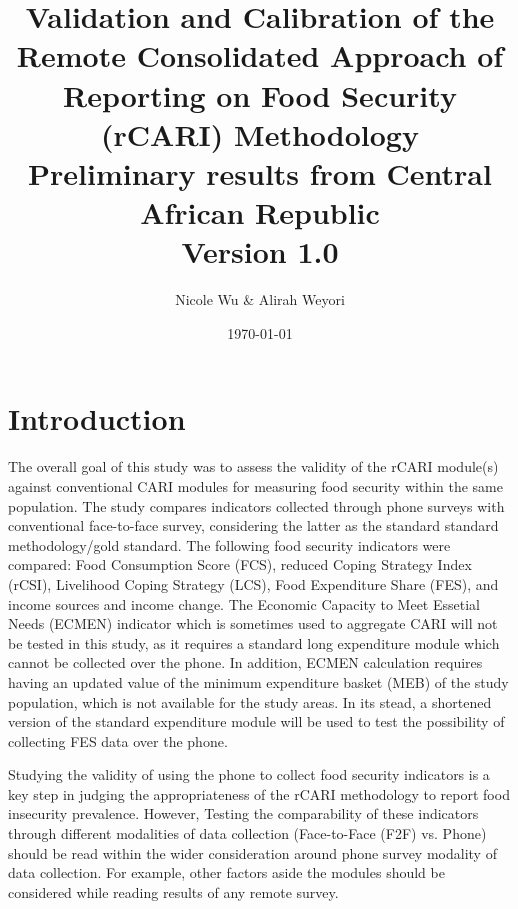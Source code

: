 \documentclass[11pt,harvard]{article}
\author{Nicole Wu \& Alirah Weyori}
\date{\today}
\title{Validation and Calibration of the Remote Consolidated Approach of Reporting on Food Security (rCARI) Methodology 
	\\ {\normalsize Preliminary results from Central African Republic} 
	\\{\normalsize{Version 1.0}} }
\begin{document}
	\maketitle \vspace{-1cm}
	\onehalfspacing
	\pagebreak
	\setlength{\parskip}{6pt} %
	
	
	\section{Introduction}
	The overall goal of this study was to assess the validity of the rCARI module(s) against conventional CARI modules for measuring food security within the same population. The study compares indicators collected through phone surveys with conventional face-to-face survey, considering the latter as the standard standard methodology/gold standard. The following food security indicators were compared: Food Consumption Score (FCS), reduced Coping Strategy Index (rCSI), Livelihood Coping Strategy (LCS), Food Expenditure Share (FES), and income sources and income change. The Economic Capacity to Meet Essetial Needs (ECMEN) indicator which is sometimes used to aggregate CARI will not be tested in this study, as it requires a standard long expenditure module which cannot be collected over the phone. In addition, ECMEN calculation requires having an updated value of the minimum expenditure basket (MEB) of the study population, which is not available for the study areas. In its stead, a shortened version of the standard expenditure module will be used to test the possibility of collecting FES data over the phone.
	
	Studying the validity of using the phone to collect food security indicators is a key step in judging the appropriateness of the rCARI methodology to report food insecurity prevalence. However, Testing the comparability of these indicators through different modalities of data collection (Face-to-Face (F2F) vs. Phone) should be read within the wider consideration around phone survey modality of data collection. For example, other factors aside the modules should be considered while reading results of any remote survey.
	
\end{document}
